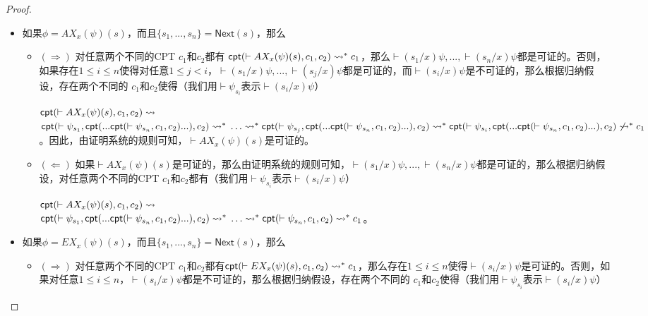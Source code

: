 \begin{proof}
\begin{itemize}
		\item 如果$\phi = AX_x(\psi)(s)$，而且$\{s_1,...,s_n\}=\textsf{Next}(s)$，那么
		\begin{itemize}
			\item $(\Rightarrow)$ 对任意两个不同的\textsf{CPT} $c_1$和$c_2$都有
			$\textsf{cpt}(\vdash AX_x(\psi)(s), c_1, c_2)\rightsquigarrow^* c_1$，那么$\vdash(s_1/x)\psi,...,\vdash(s_n/x)\psi$都是可证的。否则，如果存在$1\le i\le n$使得对任意$1\le j < i$，$\vdash(s_1/x)\psi,...,\vdash(s_j/x)\psi$都是可证的，而$\vdash(s_i/x)\psi$是不可证的，那么根据归纳假设，存在两个不同的 \CPT{} $c_1$和$c_2$使得（我们用$\vdash\psi_{s_i}$表示$\vdash(s_i/x)\psi$）
			
			$\textsf{cpt}(\vdash
			AX_x(\psi)(s), c_1, c_2)\rightsquigarrow$ \\
			$\textsf{cpt}(\vdash\psi_{s_1},
			\textsf{cpt}(...\textsf{cpt}(\vdash\psi_{s_n}, c_1,
			c_2)...), c_2)\rightsquigarrow^*\\
			\ldots\rightsquigarrow^*\\
			\textsf{cpt}(\vdash\psi_{s_j},
			\textsf{cpt}(...\textsf{cpt}(\vdash\psi_{s_n}, c_1,
			c_2)...), c_2)\rightsquigarrow^*\\
			\textsf{cpt}(\vdash\psi_{s_i},
			\textsf{cpt}(...\textsf{cpt}(\vdash\psi_{s_n}, c_1,
			c_2)...), c_2)\not\rightsquigarrow^*\\
			c_1$。因此，由证明系统的规则可知，$\vdash AX_x(\psi)(s)$是可证的。
			\item $(\Leftarrow)$ 如果$\vdash AX_x(\psi)(s)$是可证的，那么由证明系统的规则可知，$\vdash(s_1/x)\psi,...,\vdash(s_n/x)\psi$都是可证的，那么根据归纳假设，对任意两个不同的\textsf{CPT} $c_1$和$c_2$都有（我们用$\vdash\psi_{s_i}$表示$\vdash(s_i/x)\psi$） 
			
			$\textsf{cpt}(\vdash
			AX_x(\psi)(s), c_1, c_2)\rightsquigarrow$ \\
			$\textsf{cpt}(\vdash\psi_{s_1},
			\textsf{cpt}(...\textsf{cpt}(\vdash\psi_{s_n}, c_1,
			c_2)...), c_2)\rightsquigarrow^*\\
			\ldots\rightsquigarrow^*\\
			\textsf{cpt}(\vdash\psi_{s_n}, c_1,
			c_2)\rightsquigarrow^*c_1$。
		\end{itemize}
		
		\item 如果$\phi = EX_x(\psi)(s)$，而且$\{s_1,...,s_n\}=\textsf{Next}(s)$，那么
		\begin{itemize}
			\item $(\Rightarrow)$ 对任意两个不同的\textsf{CPT} $c_1$和$c_2$都有$\textsf{cpt}(\vdash EX_x(\psi)(s), c_1, c_2)\rightsquigarrow^* c_1$，那么存在$1\le i\le n$使得$\vdash(s_i/x)\psi$是可证的。否则，如果对任意$1\le i\le n$，$\vdash(s_i/x)\psi$都是不可证的，那么根据归纳假设，存在两个不同的\CPT{} $c_1$和$c_2$使得（我们用$\vdash\psi_{s_i}$表示$\vdash(s_i/x)\psi$）
			

\end{itemize}
\end{itemize}
\end{proof}
